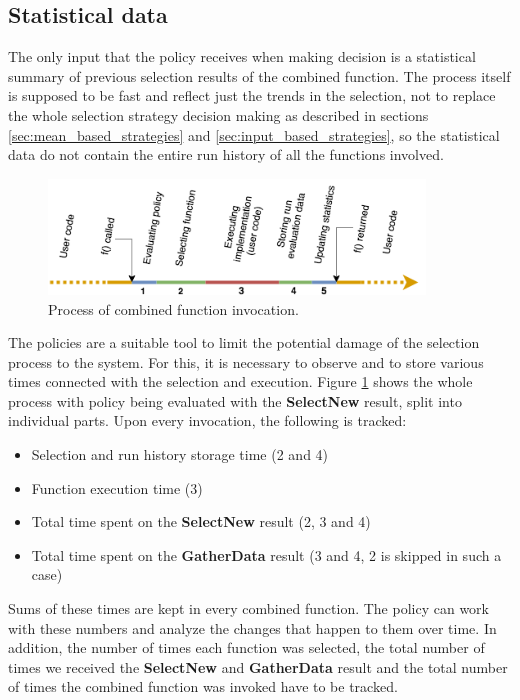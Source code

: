 \subsection{Statistical data}
\label{subsec:statistical_data}

The only input that the policy receives when making decision is a statistical summary of previous selection results of the combined function. The process itself is supposed to be fast and reflect just the trends in the selection, not to replace the whole selection strategy decision making as described in sections \ref{sec:mean_based_strategies} and \ref{sec:input_based_strategies}, so the statistical data do not contain the entire run history of all the functions involved.

\begin{figure}[h!]
	\captionsetup{justification=centering,margin=0.5cm}
	\centerline{\mbox{\includegraphics[width=100mm]{./img/run_schema.png}}}
	\caption{Process of combined function invocation.}
	\label{fig:run_schema}
\end{figure}

The policies are a suitable tool to limit the potential damage of the selection process to the system. For this, it is necessary to observe and to store various times connected with the selection and execution. Figure \ref{fig:run_schema} shows the whole process with policy being evaluated with the \textbf{SelectNew} result, split into individual parts. Upon every invocation, the following is tracked:

\begin{itemize}
	\item Selection and run history storage time (2 and 4)
	\item Function execution time (3)
	\item Total time spent on the \textbf{SelectNew} result (2, 3 and 4)
	\item Total time spent on the \textbf{GatherData} result (3 and 4, 2 is skipped in such a case)
\end{itemize}

Sums of these times are kept in every combined function. The policy can work with these numbers and analyze the changes that happen to them over time. In addition, the number of times each function was selected, the total number of times we received the \textbf{SelectNew} and \textbf{GatherData} result and the total number of times the combined function was invoked have to be tracked. 

